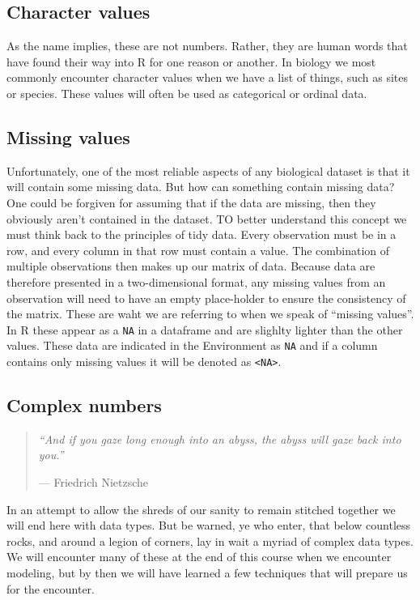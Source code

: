 \documentclass[english,10pt,a4paper,oneside]{book}
\theoremstyle{definition}
\theoremstyle{definition}
\theoremstyle{definition}
\theoremstyle{remark}
\begin{document}
\subsection{Character values}\label{character-values}

As the name implies, these are not numbers. Rather, they are human words
that have found their way into R for one reason or another. In biology
we most commonly encounter character values when we have a list of
things, such as sites or species. These values will often be used as
categorical or ordinal data.

\subsection{Missing values}\label{missing-values}

Unfortunately, one of the most reliable aspects of any biological
dataset is that it will contain some missing data. But how can something
contain missing data? One could be forgiven for assuming that if the
data are missing, then they obviously aren't contained in the dataset.
TO better understand this concept we must think back to the principles
of tidy data. Every observation must be in a row, and every column in
that row must contain a value. The combination of multiple observations
then makes up our matrix of data. Because data are therefore presented
in a two-dimensional format, any missing values from an observation will
need to have an empty place-holder to ensure the consistency of the
matrix. These are waht we are referring to when we speak of
\enquote{missing values}. In R these appear as a \texttt{NA} in a
dataframe and are slighlty lighter than the other values. These data are
indicated in the Environment as \texttt{NA} and if a column contains
only missing values it will be denoted as
\texttt{\textless{}NA\textgreater{}}.

\subsection{Complex numbers}\label{complex-numbers}

\begin{quote}
\emph{\enquote{And if you gaze long enough into an abyss, the abyss will
gaze back into you.}}

--- Friedrich Nietzsche
\end{quote}

In an attempt to allow the shreds of our sanity to remain stitched
together we will end here with data types. But be warned, ye who enter,
that below countless rocks, and around a legion of corners, lay in wait
a myriad of complex data types. We will encounter many of these at the
end of this course when we encounter modeling, but by then we will have
learned a few techniques that will prepare us for the encounter.
\end{document}

